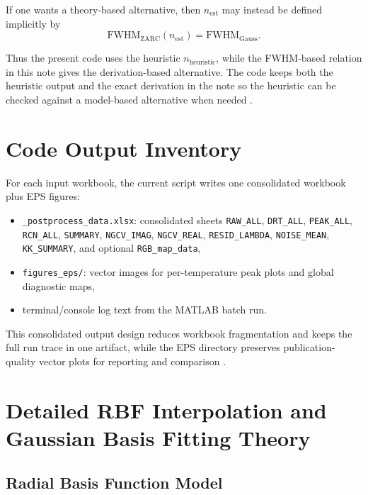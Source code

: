 \documentclass[11pt]{article}
\begin{document}
If one wants a theory-based alternative, then $n_{\mathrm{est}}$ may instead be defined implicitly by
\begin{equation}
\mathrm{FWHM}_{\mathrm{ZARC}}(n_{\mathrm{est}}) = \mathrm{FWHM}_{\mathrm{Gauss}}.
\end{equation}

Thus the present code uses the heuristic $n_{\mathrm{heuristic}}$, while the FWHM-based relation in this note gives the derivation-based alternative. The code keeps both the heuristic output and the exact derivation in the note so the heuristic can be checked against a model-based alternative when needed \cite{maradesa2023,carbone2025}.

\section{Code Output Inventory}

For each input workbook, the current script writes one consolidated workbook plus EPS figures:

\begin{itemize}
\item \texttt{\_postprocess\_data.xlsx}: consolidated sheets \texttt{RAW\_ALL}, \texttt{DRT\_ALL}, \texttt{PEAK\_ALL}, \texttt{RCN\_ALL}, \texttt{SUMMARY}, \texttt{NGCV\_IMAG}, \texttt{NGCV\_REAL}, \texttt{RESID\_LAMBDA}, \texttt{NOISE\_MEAN}, \texttt{KK\_SUMMARY}, and optional \texttt{RGB\_map\_data},
\item \texttt{figures\_eps/}: vector images for per-temperature peak plots and global diagnostic maps,
\item terminal/console log text from the MATLAB batch run.
\end{itemize}

This consolidated output design reduces workbook fragmentation and keeps the full run trace in one artifact, while the EPS directory preserves publication-quality vector plots for reporting and comparison \cite{schluter2019,maradesa2023,carbone2025}.

\section{Detailed RBF Interpolation and Gaussian Basis Fitting Theory}

\subsection{Radial Basis Function Model}
\end{document}
